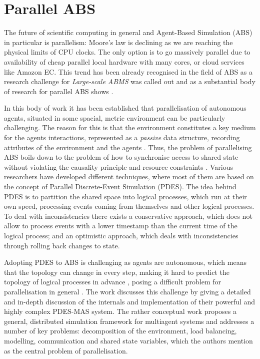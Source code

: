 \chapter{Parallel ABS}
\label{ch:parallel_abs}
The future of scientific computing in general and Agent-Based Simulation (ABS) in particular is parallelism: Moore's law is declining as we are reaching the physical limits of CPU clocks. The only option is to go massively parallel due to availability of cheap parallel local hardware with many cores, or cloud services like Amazon EC. This trend has been already recognised in the field of ABS as a research challenge for \textit{Large-scale ABMS} \cite{macal_everything_2016} was called out and as a substantial body of research for parallel ABS shows \cite{abar_agent_2017, cicirelli_efficient_2015,  gasser_mace3j:_2002,  gorur_repast_2016, hay_experiments_2015, himmelspach_plugn_2007, lees_using_2008, logan_distributed_2001, minson_distributing_2008, riley_next_2003, suryanarayanan_synchronised_2013, suryanarayanan_pdes-mas_2013}. 

In this body of work it has been established that parallelisation of autonomous agents, situated in some spacial, metric environment can be particularly challenging. The reason for this is that the environment constitutes a key medium for the agents interactions, represented as a \textit{passive} data structure, recording attributes of the environment and the agents \cite{lees_using_2008}. Thus, the problem of parallelising ABS boils down to the problem of how to synchronise access to shared state without violating the causality principle and resource constraints \cite{logan_distributed_2001, suryanarayanan_pdes-mas_2013}. Various researchers have developed different techniques, where most of them are based on the concept of Parallel Discrete-Event Simulation (PDES). The idea behind PDES is to partition the shared space into logical processes, which run at their own speed, processing events coming from themselves and other logical processes. To deal with inconsistencies there exists a conservative approach, which does not allow to process events with a lower timestamp than the current time of the logical process; and an optimistic approach, which deals with inconsistencies through rolling back changes to state.

Adopting PDES to ABS is challenging as agents are autonomous, which means that the topology can change in every step, making it hard to predict the topology of logical processes in advance \cite{lees_using_2008}, posing a difficult problem for parallelisation in general \cite{cicirelli_efficient_2015}. The work \cite{suryanarayanan_synchronised_2013, suryanarayanan_pdes-mas_2013} discusses this challenge by giving a detailed and in-depth discussion of the internals and implementation of their powerful and highly complex PDES-MAS system. The rather conceptual work \cite{logan_distributed_2001} proposes a general, distributed simulation framework for multiagent systems and addresses a number of key problems: decomposition of the environment, load balancing, modelling, communication and shared state variables, which the authors mention as the central problem of parallelisation.

